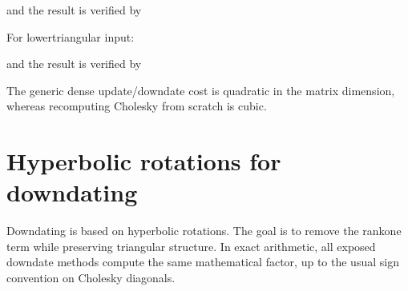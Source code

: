 \documentclass[a4paper,11pt,english]{sphinxmanual}
\begin{document}
\sphinxAtStartPar
and the result is verified by

\begin{sphinxVerbatim}[commandchars=\\\{\}]
        
\end{sphinxVerbatim}

\sphinxAtStartPar
For lower\sphinxhyphen{}triangular input:

\begin{sphinxVerbatim}[commandchars=\\\{\}]
    
\end{sphinxVerbatim}

\sphinxAtStartPar
and the result is verified by

\begin{sphinxVerbatim}[commandchars=\\\{\}]
        
\end{sphinxVerbatim}

\sphinxAtStartPar
The generic dense update/downdate cost is quadratic in the matrix dimension,
whereas recomputing Cholesky from scratch is cubic.


\section{Hyperbolic rotations for downdating}
\label{\detokenize{manual:hyperbolic-rotations-for-downdating}}
\sphinxAtStartPar
Downdating is based on hyperbolic rotations.  The goal is to remove the
rank\sphinxhyphen{}one term while preserving triangular structure.  In exact arithmetic,
all exposed downdate methods compute the same mathematical factor, up to the
usual sign convention on Cholesky diagonals.
\end{document}
